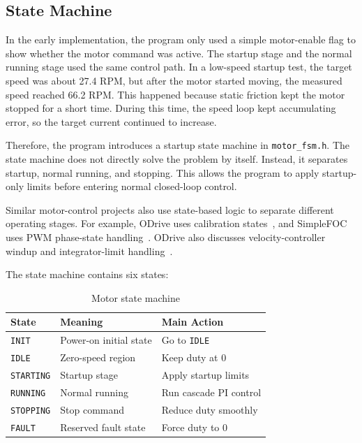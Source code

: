 \documentclass[12pt, a4paper]{report}
\begin{document}
\subsection{State Machine}

In the early implementation, the program only used a simple motor-enable flag to show whether the motor command was active. The startup stage and the normal running stage used the same control path. In a low-speed startup test, the target speed was about 27.4 RPM, but after the motor started moving, the measured speed reached 66.2 RPM. This happened because static friction kept the motor stopped for a short time. During this time, the speed loop kept accumulating error, so the target current continued to increase.

Therefore, the program introduces a startup state machine in \texttt{motor\_fsm.h}. The state machine does not directly solve the problem by itself. Instead, it separates startup, normal running, and stopping. This allows the program to apply startup-only limits before entering normal closed-loop control.

Similar motor-control projects also use state-based logic to separate different operating stages. For example, ODrive uses calibration states~\cite{odrive_state}, and SimpleFOC uses PWM phase-state handling~\cite{simplefoc_phase_state}. ODrive also discusses velocity-controller windup and integrator-limit handling~\cite{odrive_integrator}.

The state machine contains six states:

\begin{table}[H]
\centering
\caption{Motor state machine}
\label{tab:motor_fsm}
\begin{tabular}{@{}p{}p{}p{}@{}}
\toprule
State & Meaning & Main Action \\
\midrule
\texttt{INIT} & Power-on initial state & Go to \texttt{IDLE} \\
\texttt{IDLE} & Zero-speed region & Keep duty at 0 \\
\texttt{STARTING} & Startup stage & Apply startup limits \\
\texttt{RUNNING} & Normal running & Run cascade PI control \\
\texttt{STOPPING} & Stop command & Reduce duty smoothly \\
\texttt{FAULT} & Reserved fault state & Force duty to 0 \\
\bottomrule
\end{tabular}
\end{table}
\end{document}
